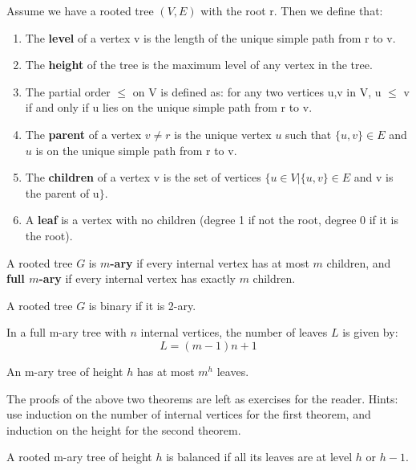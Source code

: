 \begin{definition}
Assume we have a rooted tree $(V,E)$ with the root r. Then we define that:
\begin{enumerate}
    \item The \textbf{level} of a vertex v is the length of the unique simple path from r to v.
    \item The \textbf{height} of the tree is the maximum level of any vertex in the tree.
    \item The partial order $\leq$ on V is defined as: for any two vertices u,v in V, u $\leq$ v if and only if u lies on the unique simple path from r to v.
    \item The \textbf{parent} of a vertex $v \neq r$ is the unique vertex $u$ such that $\{u,v\} \in E$ and $u$ is on the unique simple path from r to v.
    \item The \textbf{children} of a vertex v is the set of vertices $\{u \in V | \{u,v\} \in E$ and v is the parent of u$\}$.
    \item A \textbf{leaf} is a vertex with no children (degree 1 if not the root, degree 0 if it is the root).
\end{enumerate}
\end{definition}

\begin{definition}
A rooted tree $G$ is \textbf{$m$-ary} if every internal vertex has at most $m$ children, and \textbf{full $m$-ary} if every internal vertex has exactly $m$ children.
\end{definition}

\begin{definition}
A rooted tree $G$ is binary if it is 2-ary.
\end{definition}

\begin{theorem}
In a full m-ary tree with $n$ internal vertices, the number of leaves $L$ is given by:
\[ L = (m-1)n + 1 \]
\end{theorem}

\begin{theorem}
An m-ary tree of height $h$ has at most $m^h$ leaves.
\end{theorem}

The proofs of the above two theorems are left as exercises for the reader. Hints: use induction on the number of internal vertices for the first theorem, and induction on the height for the second theorem.

\begin{definition}
A rooted m-ary tree of height $h$ is balanced if all its leaves are at level $h$ or $h-1$.
\end{definition}

